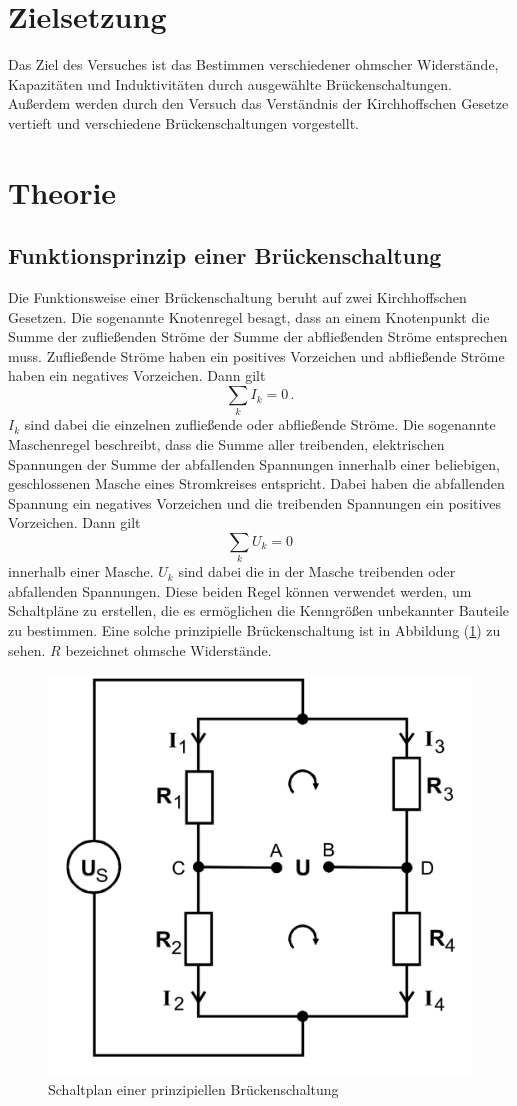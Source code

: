 \section{Zielsetzung}
\label{sec:Zielsetzung}
Das Ziel des Versuches ist das Bestimmen verschiedener ohmscher Widerstände, Kapazitäten und Induktivitäten durch ausgewählte Brückenschaltungen. Außerdem werden 
durch den Versuch das Verständnis der Kirchhoffschen Gesetze vertieft und verschiedene Brückenschaltungen vorgestellt.  

\section{Theorie}
\label{sec:Theorie}
    \subsection{Funktionsprinzip einer Brückenschaltung}
    Die Funktionsweise einer Brückenschaltung beruht auf zwei Kirchhoffschen Gesetzen. Die sogenannte Knotenregel besagt, dass an einem Knotenpunkt die Summe der 
    zufließenden Ströme der Summe der abfließenden Ströme entsprechen muss. Zufließende Ströme haben ein positives Vorzeichen und abfließende Ströme haben ein 
    negatives Vorzeichen. Dann gilt 
    \begin{equation}
        \label{eqn:Knotenregel}
        \sum_k {I_k} = 0 \,.
    \end{equation}
    $I_k$ sind dabei die einzelnen zufließende oder abfließende Ströme. 
    Die sogenannte Maschenregel beschreibt, dass die Summe aller treibenden, elektrischen Spannungen der Summe der abfallenden Spannungen innerhalb einer beliebigen, geschlossenen 
    Masche eines Stromkreises entspricht. Dabei haben die abfallenden Spannung ein negatives Vorzeichen und die treibenden Spannungen ein positives Vorzeichen. 
    Dann gilt
    \begin{equation}
        \label{eqn:Maschenregel}
        \sum_k {U_k} = 0 
    \end{equation}
    innerhalb einer Masche. $U_k$ sind dabei die in der Masche treibenden oder abfallenden Spannungen. 
    Diese beiden Regel können verwendet werden, um Schaltpläne zu erstellen, die es ermöglichen die Kenngrößen unbekannter Bauteile zu bestimmen. Eine 
    solche prinzipielle Brückenschaltung ist in Abbildung (\ref{pic:prinzipielle_Brückenschaltung}) zu sehen. $R$ bezeichnet ohmsche Widerstände.
    \begin{figure}[H]
        \centering
        \includegraphics[width=0.4\linewidth]{prinzipielle_Schaltung.png}
        \caption{Schaltplan einer prinzipiellen Brückenschaltung}
        \label{pic:prinzipielle_Brückenschaltung}
    \end{figure}
